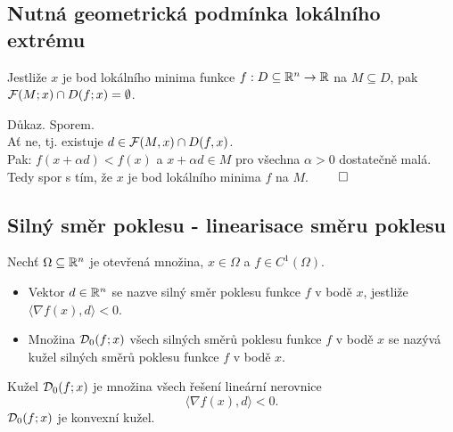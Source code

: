 \subsection{Nutná geometrická podmínka lokálního extrému}
Jestliže $x$ je bod lokálního minima funkce $f : D \subseteq \mathbb{R}^n \rightarrow \mathbb{R}$ na $M \subseteq D$, pak
$\mathcal{F}(M; x) \cap D(f;x) = \emptyset$.

Důkaz. Sporem. \\
Ať ne, tj. existuje $d \in \mathcal{F}(M, x) \cap D(f, x)$.\\
Pak: $f (x + \alpha d) < f(x)$ a $x + \alpha d \in M$ pro všechna $\alpha > 0$ dostatečně malá.\\
Tedy spor s tím, že $x$ je bod lokálního minima $f$ na $M$. $\qed$

\subsection{Silný směr poklesu - linearisace směru poklesu}
Nechť $\Omega \subseteq \mathbb{R}^n$ je otevřená množina, $x \in \Omega$ a $f \in C^{1}(\Omega)$.
\begin{itemize}
    \item Vektor $d \in \mathbb{R}^n$ se nazve silný směr poklesu funkce $f$ v bodě $x$, jestliže $\langle \nabla f(x), d\rangle < 0$.
    \item Množina $\mathcal{D}_0(f; x)$ všech silných směrů poklesu funkce $f$ v bodě $x$ se nazývá kužel silných směrů poklesu
    funkce $f$ v bodě $x$.
\end{itemize}
Kužel $\mathcal{D}_0(f; x)$ je množina všech řešení lineární nerovnice \[\langle \nabla f(x), d\rangle < 0.\]
$\mathcal{D}_0(f;x)$ je konvexní kužel.

